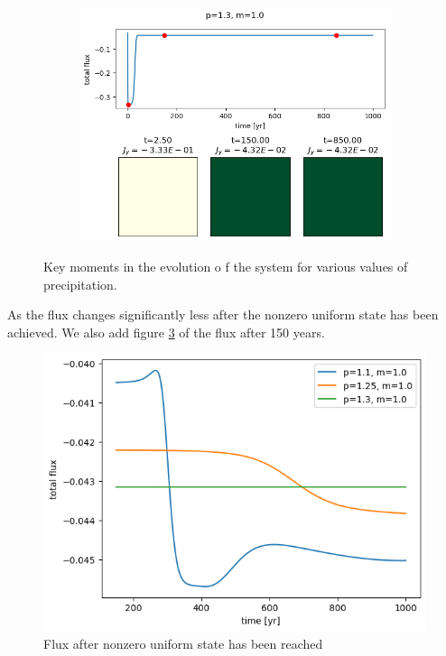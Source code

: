 \documentclass{article}
\numberwithin{equation}{section}
\begin{document}
\begin{figure}[!ht]
\begin{subfigure}[]{0.5\textwidth}
    \end{subfigure}
    \begin{subfigure}[]{0.5\textwidth}
        \centering
        \includegraphics[scale=0.5]{plots/p1_3_m1_0.png}
        \label{subfig:p13}
    \end{subfigure}
    \centering
    \caption{Key moments in the evolution o f the system for various values of precipitation.}
    \label{fig:key_moments}
\end{figure}
As the flux changes significantly less after the nonzero uniform state has been achieved. We also add figure \ref{fig:flux_dropoff} of the flux after 150 years.
\begin{figure}[!ht]
    \centering
    \includegraphics[scale=0.5]{plots/flux_dropoff.png}
    \caption{Flux after nonzero uniform state has been reached}
    \label{fig:flux_dropoff}
\end{figure}
\end{document}
